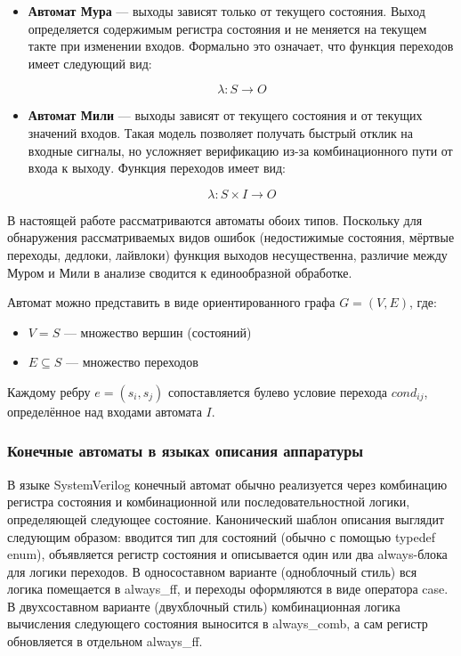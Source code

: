 \begin{itemize}
\item \textbf{Автомат Мура} --- выходы зависят только от текущего состояния. Выход определяется
содержимым регистра состояния и не меняется на текущем такте при изменении входов. Формально это означает,
что функция переходов имеет следующий вид:

$$
\lambda: S \rightarrow O
$$

\item \textbf{Автомат Мили} — выходы зависят от текущего состояния и от текущих значений входов.
Такая модель позволяет получать быстрый отклик на входные сигналы, но усложняет верификацию
из-за комбинационного пути от входа к выходу. Функция переходов имеет вид:

$$
\lambda: S \times I \rightarrow O
$$

\end{itemize}

В настоящей работе рассматриваются автоматы обоих типов. Поскольку для обнаружения рассматриваемых видов
ошибок (недостижимые состояния, мёртвые переходы, дедлоки, лайвлоки) функция выходов несущественна,
различие между Муром и Мили в анализе сводится к единообразной обработке.

Автомат можно представить в виде ориентированного графа $G = (V, E)$, где:

\begin{itemize}
    \item $V = S$ --- множество вершин (состояний)
    \item $E \subseteq S$ --- множество переходов
\end{itemize}

Каждому ребру $e = (s_i, s_j)$ сопоставляется булево условие перехода $cond_{ij}$, определённое над
входами автомата $I$.

\subsubsection{Конечные автоматы в языках описания аппаратуры}

В языке SystemVerilog конечный автомат обычно реализуется через комбинацию регистра состояния и
комбинационной или последовательностной логики, определяющей следующее состояние. Канонический шаблон
описания выглядит следующим образом: вводится тип для состояний (обычно с помощью typedef enum),
объявляется регистр состояния и описывается один или два always-блока для логики переходов.
В односоставном варианте (одноблочный стиль) вся логика помещается в always\_ff, и переходы оформляются
в виде оператора case. В двухсоставном варианте (двухблочный стиль) комбинационная логика вычисления
следующего состояния выносится в always\_comb, а сам регистр обновляется в отдельном always\_ff.

